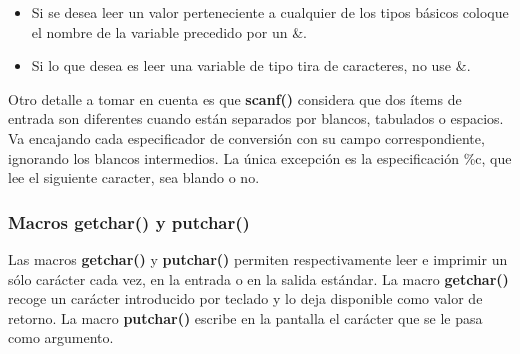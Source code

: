 \begin{itemize}
	\item Si se desea leer un valor perteneciente a cualquier de los tipos básicos coloque el nombre de la
variable precedido por un \&.
	\item Si lo que desea es leer una variable de tipo tira de caracteres, no use \&.
\end{itemize}

Otro detalle a tomar en cuenta es que \textbf{scanf()} considera que dos ítems de entrada son diferentes
 cuando están separados por blancos, tabulados o espacios. Va encajando cada especificador de
conversión con su campo correspondiente, ignorando los blancos intermedios. La única excepción
es la especificación \%c, que lee el siguiente caracter, sea blando o no.

\subsubsection{Macros getchar() y putchar()}

Las macros \textbf{getchar()} y \textbf{putchar()} permiten respectivamente leer e imprimir un sólo carácter
cada vez, en la entrada o en la salida estándar. La macro \textbf{getchar()} recoge un carácter
introducido por teclado y lo deja disponible como valor de retorno. La macro \textbf{putchar()}
escribe en la pantalla el carácter que se le pasa como argumento.
